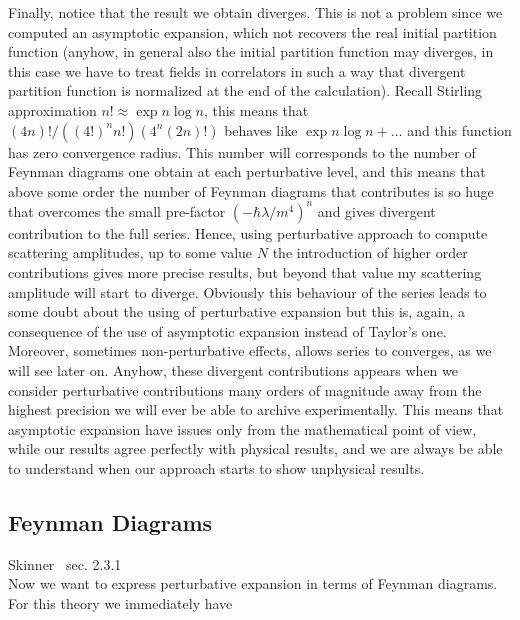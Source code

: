 \documentclass[../main/main.tex]{subfiles}
\begin{document}
Finally, notice that the result we obtain diverges. This is not a problem since we computed an asymptotic expansion, which not recovers the real initial partition function (anyhow, in general also the initial partition function may diverges, in this case we have to treat fields in correlators in such a way that divergent partition function is normalized at the end of the calculation). Recall Stirling approximation $n!\approx\exp{n\log n}$, this means that $(4n)!/((4!)^nn!)(4^n(2n)!)$ behaves like $\exp{n\log n+\dots}$ and this function has zero convergence radius. This number will corresponds to the number of Feynman diagrams one obtain at each perturbative level, and this means that above some order the number of Feynman diagrams that contributes is so huge that overcomes the small pre-factor $(-\hbar\lambda/m^4)^n$ and gives divergent contribution to the full series. Hence,  using perturbative approach to compute scattering amplitudes, up to some value $N$ the introduction of higher order contributions gives more precise results, but beyond that value my scattering amplitude will start to diverge. Obviously this behaviour of the series leads to some doubt about the using of perturbative expansion but this is, again, a consequence of the use of asymptotic expansion instead of Taylor's one. Moreover, sometimes non-perturbative effects, allows series to converges, as we will see later on. Anyhow,  these divergent contributions appears when we consider perturbative contributions many orders of magnitude away from the highest precision we will ever be able to archive experimentally. This means that asymptotic expansion have issues only from the mathematical point of view, while our results agree perfectly with physical results, and we are always be able to understand when our approach starts to show unphysical results. 


\subsection{Feynman Diagrams}

\textsf{Skinner~\cite{Skinner:2018aa} sec. 2.3.1}\\

Now we want to express perturbative expansion in terms of Feynman diagrams. For this theory we immediately have
\end{document}
